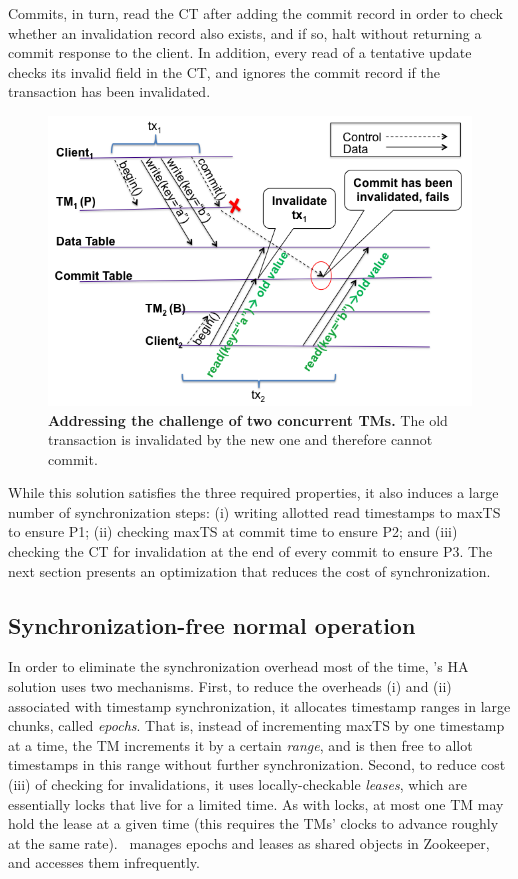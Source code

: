 Commits, in turn, read the CT after adding the commit record in order to check whether an invalidation record also exists, and if so, halt without returning a commit response to the client.  
In addition, every read of a tentative update checks its invalid field in the CT, and ignores the commit record if the transaction has been  invalidated.

\begin{figure}[t]
\includegraphics[width=\columnwidth]{omid_ha2.png}
\caption{{\bf Addressing the challenge of two concurrent TMs.} The old transaction is invalidated by the new one and therefore cannot commit.}
\label{fig:invalidate}
\end{figure}

While this solution satisfies the three required properties, it also induces a large number of synchronization steps:
(i) writing allotted read timestamps to maxTS to ensure P1; (ii) checking maxTS at commit time to ensure P2; and (iii)  
checking  the CT for invalidation at the end of every commit to ensure P3. 
The next section presents an optimization that reduces the cost of synchronization.

\subsection{Synchronization-free normal operation}
\label{ssec:opt}

In order to eliminate the synchronization overhead most of the time, \sys's HA solution uses two mechanisms. 
First, to reduce the overheads  (i) and (ii) associated with timestamp synchronization, it 
allocates timestamp ranges in large chunks, called \emph{epochs}. 
That is, instead of incrementing maxTS by one timestamp at a time, the TM increments it by a certain \emph{range}, 
and is then free to allot timestamps in this range without further synchronization.
Second, to reduce  cost (iii) of checking for invalidations, 
it uses locally-checkable \emph{leases}, which are essentially locks that live for a limited time. As with locks, at most one TM may hold the lease at a given time (this requires the TMs' clocks to advance roughly at the same rate). 
\sys\ manages epochs and leases as shared objects in Zookeeper, and accesses them infrequently. 

